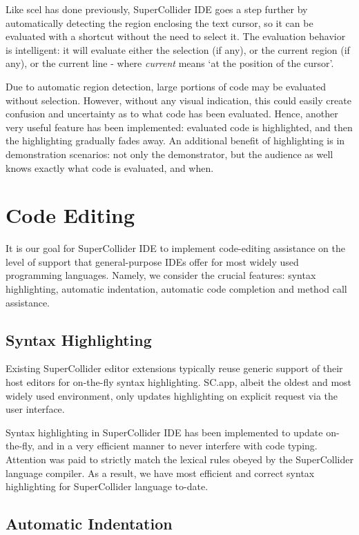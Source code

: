 \documentclass[11pt,a4paper]{article}
\begin{document}
Like scel has done previously, SuperCollider IDE goes a step further by automatically detecting the region enclosing
the text cursor, so it can be evaluated with a shortcut without the need to select it. The evaluation behavior is
intelligent: it will evaluate either the selection (if any), or the current region (if any), or the current line - where
\emph{current} means `at the position of the cursor'.

Due to automatic region detection, large portions of code may be evaluated without selection. However, without any
visual indication, this could easily create confusion and uncertainty as to what code has been evaluated. Hence,
another very useful feature has been implemented: evaluated code is highlighted, and then the highlighting gradually
fades away. An additional benefit of highlighting is in demonstration scenarios: not only the demonstrator, but the
audience as well knows exactly what code is evaluated, and when.

\section{Code Editing}

It is our goal for SuperCollider IDE to implement code-editing assistance on the level of support that general-purpose
IDEs offer for most widely used programming languages. Namely, we consider the crucial features: syntax highlighting,
automatic indentation, automatic code completion and method call assistance.

\subsection{Syntax Highlighting}
\label{syntax-highlighting}

Existing SuperCollider editor extensions typically reuse generic support of their host editors for
on-the-fly syntax highlighting. SC.app, albeit the oldest and most widely used environment, only
updates highlighting on explicit request via the user interface.

Syntax highlighting in SuperCollider IDE has been implemented to update on-the-fly, and in a very
efficient manner to never interfere with code typing. Attention was paid to strictly match the
lexical rules obeyed by the SuperCollider language compiler. As a result, we have most efficient and
correct syntax highlighting for SuperCollider language to-date.

\subsection{Automatic Indentation}
\label{auto-indentation}
\end{document}
